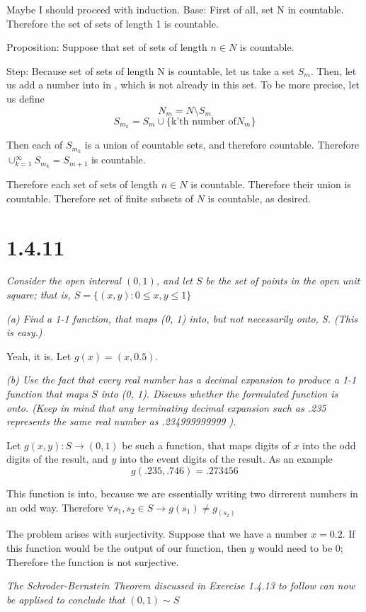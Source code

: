 \documentclass[11pt,oneside,titlepage]{article}
\begin{document}
Maybe I should proceed with induction.
Base: 
First of all, set N in countable.  Therefore the set of sets of length 1 is countable.

Proposition:
Suppose that set of sets of length $n \in N$ is countable.

Step:
Because set of sets of length N is countable, let us take a set $S_m$.
Then, let us add a number into in , which is not already in this set.
To be more precise, let us define
$$N_m = N \setminus S_m$$
$$S_{m_k} = S_m\cup \{\text{k'th number of}N_m\}$$

Then each of $S_{m_k}$ is a union of countable sets, and therefore countable.
Therefore $\cup^{\infty}_{k = 1} S_{m_k} = S_{m + 1}$ is countable.

Therefore each set of sets of length $n \in N$ is countable. Therefore their union is
countable. Therefore set of finite subsets of $N$ is countable, as desired.

\section*{1.4.11}
\textit{Consider the open interval $(0,1)$, and let $S$ be the set of points in the
  open unit square; that is, $S = \{(x, y): 0 \leq x,y \leq 1\}$}

\textit{(a) Find a 1-1 function, that maps (0, 1) into, but not necessarily onto, S.
  (This is easy.)}

Yeah, it is. Let $g(x) = (x, 0.5)$.

\textit{(b) Use the fact that every real number has a decimal expansion to produce a
  1-1 function that maps $S$ into (0, 1). Discuss whether the formulated function is onto.
  (Keep in mind that any terminating decimal expansion such as .235 represents the same
  real number as .234999999999 ).}

Let $g(x, y): S \to (0, 1)$ be such a function, that maps digits of $x$ into the
odd digits of the result, and $y$ into the event digits of the result. As an example
$$g(.235, .746) = .273456$$

This function is into, because we are essentially writing two dirrerent numbers in an
odd way. 
Therefore $\forall s_1, s_2 \in S \to g(s_1) \neq g_(s_2) \ $

The problem arises with surjectivity. Suppose that we have a number $x = 0.2$. If
this function would be the output of our function, then $y$ would need to be 0;
Therefore the function is not surjective.

\textit{The Schroder-Bernstein Theorem discussed in Exercise 1.4.13 to follow
  can now be applised to conclude that $(0,1) \sim S$}
\end{document}
